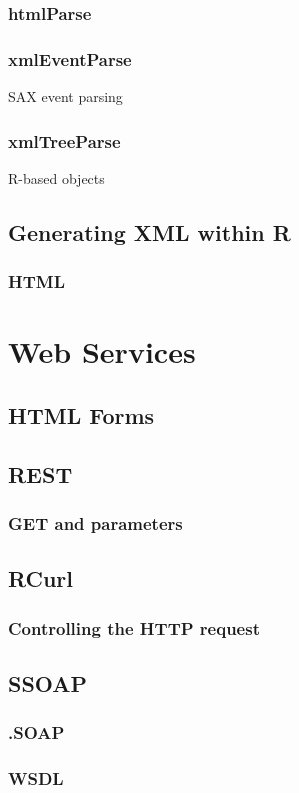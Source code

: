 \documentclass[11pt]{book}
\begin{document}
 \subsection{htmlParse}
 \subsection{xmlEventParse}
 SAX event parsing
 \subsection{xmlTreeParse}
 R-based objects

\section{Generating XML within R}
 \subsection{HTML}

\chapter{Web Services}
 \section{HTML Forms}
 \section{REST}
   \subsection{GET and parameters}
 \section{RCurl}
   \subsection{Controlling the HTTP request}
 \section{SSOAP}
   \subsection{.SOAP}
   \subsection{WSDL}
\end{document}

